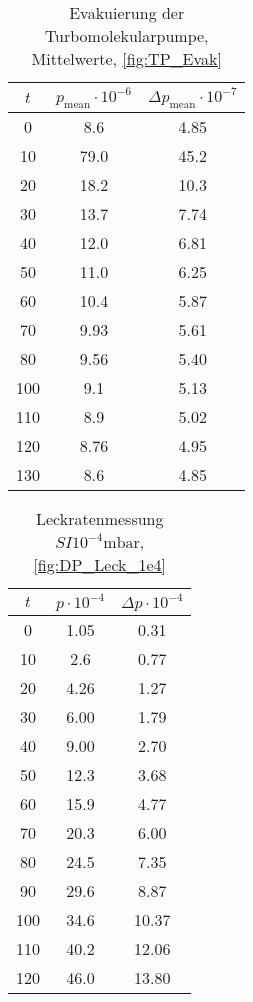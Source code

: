 \begin{table}[H]
    \centering
    \caption{Evakuierung der Turbomolekularpumpe, Mittelwerte, \ref{fig:TP_Evak}}
    \label{tab:TP_evak_mittelwert}
    \begin{tabular}{c c c}
        \toprule
        {$t$} & {$p_\text{mean} \cdot 10^{-6}$} & {$\Delta p_\text{mean} \cdot 10^{-7}$}\\
        \midrule
        0   & 8.6& 4.85  \\
        10  & 79.0 & 45.2  \\
        20  & 18.2 & 10.3\\
        30  & 13.7 & 7.74\\
        40  & 12.0 & 6.81\\
        50  & 11.0 & 6.25\\
        60  & 10.4 & 5.87\\
        70  & 9.93 & 5.61\\
        80  & 9.56& 5.40 \\
        100 & 9.1& 5.13  \\
        110 & 8.9& 5.02  \\
        120 & 8.76 & 4.95\\ 
        130 & 8.6& 4.85  \\
        \bottomrule
    \end{tabular}
\end{table}

\begin{table}[H]
    \centering
    \caption{Leckratenmessung $SI{10^{-4}} \si{\milli\bar}$, \ref{fig:DP_Leck_1e4}}
    \label{tab:}
    \begin{tabular}{c c c}
        \toprule
        {$t$} & {$p \cdot 10^{-4}$} & {$\Delta p \cdot 10^{-4}$} \\
        \midrule
        0 &   1.05 & 0.31\\
        10 &  2.6 & 0.77\\
        20 &  4.26 & 1.27\\
        30 &  6.00 & 1.79\\
        40 &  9.00 & 2.70\\
        50 &  12.3 & 3.68\\
        60 &  15.9 & 4.77\\
        70 &  20.3 & 6.00\\
        80 &  24.5 & 7.35\\
        90 &  29.6 & 8.87\\
        100 & 34.6 & 10.37\\
        110 & 40.2 & 12.06\\
        120 & 46.0 & 13.80\\
        \bottomrule
    \end{tabular}
\end{table}

